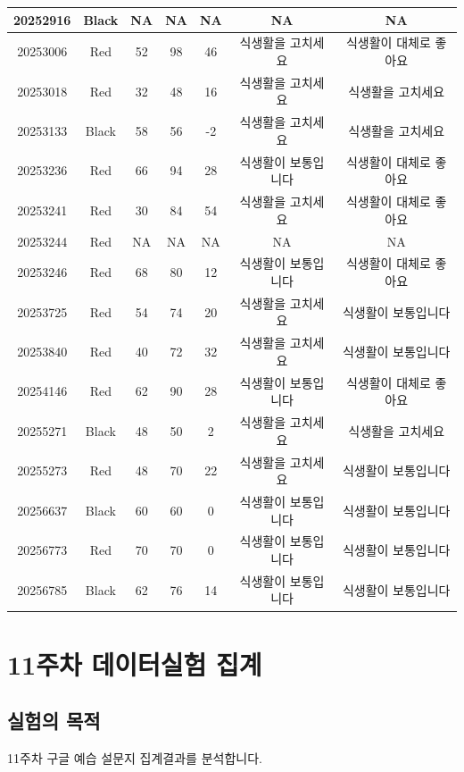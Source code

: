 \documentclass[
]{book}
\begin{document}
\begin{tabular}{c|c|c|c|c|c|c}
\hline
20252916 & Black & NA & NA & NA & NA & NA\\
\hline
20253006 & Red & 52 & 98 & 46 & 식생활을 고치세요 & 식생활이 대체로 좋아요\\
\hline
20253018 & Red & 32 & 48 & 16 & 식생활을 고치세요 & 식생활을 고치세요\\
\hline
20253133 & Black & 58 & 56 & -2 & 식생활을 고치세요 & 식생활을 고치세요\\
\hline
20253236 & Red & 66 & 94 & 28 & 식생활이 보통입니다 & 식생활이 대체로 좋아요\\
\hline
20253241 & Red & 30 & 84 & 54 & 식생활을 고치세요 & 식생활이 대체로 좋아요\\
\hline
20253244 & Red & NA & NA & NA & NA & NA\\
\hline
20253246 & Red & 68 & 80 & 12 & 식생활이 보통입니다 & 식생활이 대체로 좋아요\\
\hline
20253725 & Red & 54 & 74 & 20 & 식생활을 고치세요 & 식생활이 보통입니다\\
\hline
20253840 & Red & 40 & 72 & 32 & 식생활을 고치세요 & 식생활이 보통입니다\\
\hline
20254146 & Red & 62 & 90 & 28 & 식생활이 보통입니다 & 식생활이 대체로 좋아요\\
\hline
20255271 & Black & 48 & 50 & 2 & 식생활을 고치세요 & 식생활을 고치세요\\
\hline
20255273 & Red & 48 & 70 & 22 & 식생활을 고치세요 & 식생활이 보통입니다\\
\hline
20256637 & Black & 60 & 60 & 0 & 식생활이 보통입니다 & 식생활이 보통입니다\\
\hline
20256773 & Red & 70 & 70 & 0 & 식생활이 보통입니다 & 식생활이 보통입니다\\
\hline
20256785 & Black & 62 & 76 & 14 & 식생활이 보통입니다 & 식생활이 보통입니다\\
\hline
\end{tabular}

\chapter{11주차 데이터실험 집계}\label{uxc8fcuxcc28-uxb370uxc774uxd130uxc2e4uxd5d8-uxc9d1uxacc4}

\section{실험의 목적}\label{uxc2e4uxd5d8uxc758-uxbaa9uxc801-17}

11주차 구글 예습 설문지 집계결과를 분석합니다.
\end{document}
